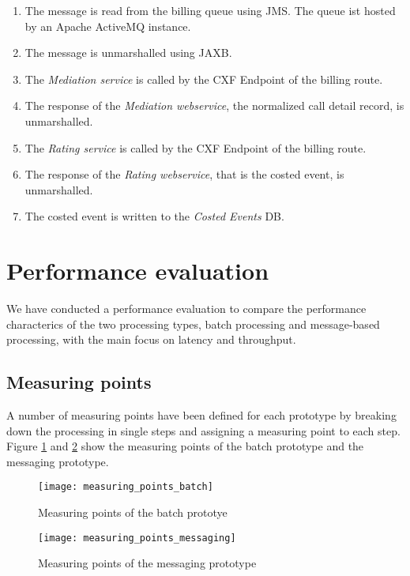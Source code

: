 \begin{enumerate}
	\item The message is read from the billing queue using JMS. The queue ist hosted by an Apache ActiveMQ instance.
	\item The message is unmarshalled using JAXB.
	\item The \emph{Mediation service} is called by the CXF Endpoint of the billing route.
	\item The response of the \emph{Mediation webservice}, the normalized call detail record, is unmarshalled. 
	\item The \emph{Rating service} is called by the CXF Endpoint of the billing route.
	\item The response of the \emph{Rating webservice}, that is the costed event, is unmarshalled.
	\item The costed event is written to the \emph{Costed Events} DB.
\end{enumerate}

\section{Performance evaluation}\label{sec:performance_evaluation}
We have conducted a performance evaluation to compare the performance characterics of the two processing types, batch processing and message-based processing, with the main focus on latency and throughput.

\subsection{Measuring points}
A number of measuring points have been defined for each prototype by breaking down the processing in single steps and assigning a measuring point to each step. Figure \ref{fig:measuring_points_batch} and \ref{fig:measuring_points_messaging} show the measuring points of the batch prototype and the messaging prototype. 

\begin{figure}[htpb]
	\centering
	\texttt{[image: measuring\_points\_batch]}
	\caption{Measuring points of the batch prototye}
	\label{fig:measuring_points_batch}
\end{figure}

\begin{figure}[htpb]
	\centering
	\texttt{[image: measuring\_points\_messaging]}
	\caption{Measuring points of the messaging prototype}
	\label{fig:measuring_points_messaging}
\end{figure}

